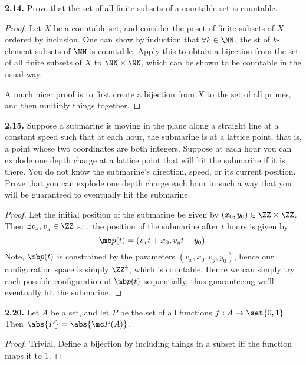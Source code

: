 \documentclass{fkbook}
\newenvironment{problem}[1][Problem \thesection.]
{\begin{boxedminipage}{\linewidth}\textbf{#1.}}
{\end{boxedminipage}}
\begin{document}
\begin{problem}[2.14]
  Prove that the set of all finite subsets of a countable set is countable.
\end{problem}
\begin{proof}
  Let $X$ be a countable set, and consider the poset of finite subsets of $X$
  ordered by inclusion. One can show by induction that $\forall k \in \NN$, the
  st of $k$-element subsets of $\NN$ is countable. Apply this to obtain a
  bijection from the set of all finite subsets of $X$ to $\NN \times \NN$, which
  can be shown to be countable in the usual way.

  A much nicer proof is to first create a bijection from $X$ to the set of all
  primes, and then multiply things together.
\end{proof}
\begin{problem}[2.15]
  Suppose a submarine is moving in the plane along a straight line at a constant
  speed such that at each hour, the submarine is at a lattice point, that is, a
  point whose two coordinates are both integers. Suppose at each hour you can
  explode one depth charge at a lattice point that will hit the submarine if it
  is there. You do not know the submarine's direction, speed, or its current
  position. Prove that you can explode one depth charge each hour in such a way
  that you will be guaranteed to eventually hit the submarine.
\end{problem}
\begin{proof}
  Let the initial position of the submarine be given by $(x_0, y_0) \in \ZZ
  \times \ZZ$. Then $\exists v_x, v_y \in \ZZ $ s.t.\ the position of the
  submarine after $t$ hours is given by
  \[
    \mb p(t) = (v_x t + x_0, v_y t + y_0).
  \]
  Note, $\mb p(t)$ is constrained by the parameters $(v_x, x_0, v_y, y_0)$,
  hence our configuration space is simply $\ZZ^4$, which is countable. Hence we
  can simply try each possible configuration of $\mb p(t)$ sequentially, thus
  guaranteeing we'll eventually hit the submarine.
\end{proof}
\begin{problem}[2.20]
  Let $A$ be a set, and let $P$ be the set of all functions $f : A \to
  \set{0,1}$. Then $\abs{P} = \abs{\mc P(A)}$.
\end{problem}
\begin{proof}
  Trivial. Define a bijection by including things in a subset iff the function
  maps it to 1.
\end{proof}
\end{document}
